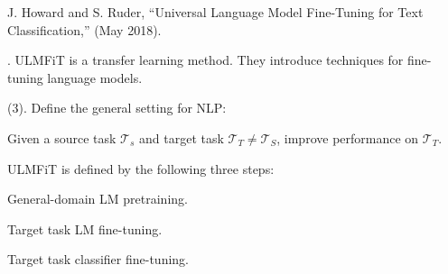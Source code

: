 \documentclass[11pt]{article}
\newcommand\myspace[1][]{\vspace{#1\bigskipamount}}
\newcommand\p{\Needspace{10\baselineskip} \noindent}
\begin{document}
\vspace{-1em}
{\footnotesize J. Howard and S. Ruder, ``Universal Language Model Fine-Tuning for Text Classification,'' (May 2018).}

\p {}. ULMFiT is a transfer learning method. They introduce techniques for fine-tuning language models.

\myspace
\p {} (3). Define the general  setting for NLP:
\begin{definition}[-1em]
	Given a source task $\mathcal{T}_s$ and target task $\mathcal{T}_T \ne \mathcal{T}_S$, improve performance on $\mathcal{T}_T$. 
\end{definition}
ULMFiT is defined by the following three steps:
\begin{compactenum}
	\item General-domain LM pretraining.
	\item Target task LM fine-tuning.
	\item Target task classifier fine-tuning.
\end{compactenum}
\end{document}
